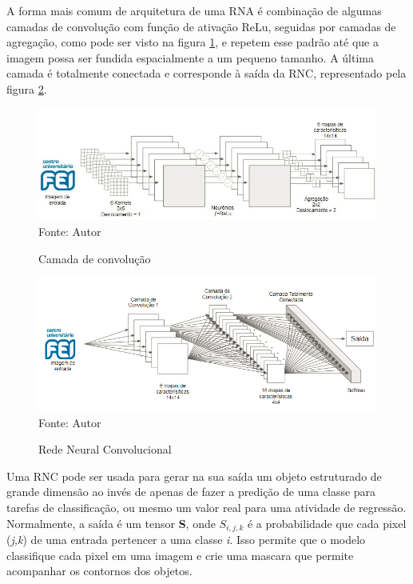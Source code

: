 \documentclass[
	12pt,				%
    oneside,			%
	a4paper,			%
	english,			%
	french,				%
	spanish,			%
	brazil,				%
	]{abntex2}
\begin{document}
A forma mais comum de arquitetura de uma RNA é combinação de algumas camadas de convolução com função de ativação ReLu, seguidas por camadas de agregação, como pode ser visto na figura \ref{fig:camada_convolucao}, e repetem esse padrão até que a imagem possa ser fundida espacialmente a um pequeno tamanho. A última camada é totalmente conectada e corresponde à saída da RNC, representado pela figura \ref{fig:RNC}.

\begin{figure}[H]
    \centering
    \caption{Camada de convolução}
    \includegraphics[width=\textwidth]{camada_convolucao1}\\
    Fonte: Autor\hfill
    \label{fig:camada_convolucao}
\end{figure} 

\begin{figure}[H]
    \centering
    \caption{Rede Neural Convolucional}
    \includegraphics[width=\textwidth]{RNC1}\\
    Fonte: Autor\hfill
    \label{fig:RNC}
\end{figure} 




Uma RNC pode ser usada para gerar na sua saída um objeto estruturado de grande dimensão ao invés de apenas de fazer a predição de uma classe para tarefas de classificação, ou mesmo um valor real para uma atividade de regressão. Normalmente, a saída é um tensor \textbf{S}, onde \textbf{$S_{i,j,k}$} é a probabilidade que cada pixel (\textit{j,k}) de uma entrada pertencer a uma classe \textit{i}. Isso permite que o modelo classifique cada pixel em uma imagem e crie uma mascara que permite acompanhar os contornos dos objetos.
\end{document}
